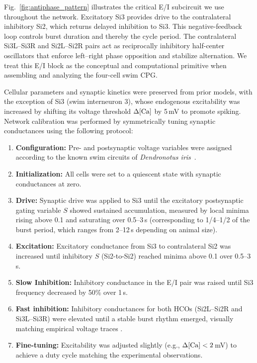\documentclass[nofootinbib,aip,amsmath,amssymb,preprint,twocolumn,floatfix,10pt]{revtex4-2}
\begin{document}
Fig.~\ref{fig:antiphase_pattern} illustrates the critical E/I subcircuit we use throughout the network. Excitatory Si3 provides drive to the contralateral inhibitory Si2, which returns delayed inhibition to Si3. This negative-feedback loop controls burst duration and thereby the cycle period. The contralateral Si3L--Si3R and Si2L--Si2R pairs act as reciprocally inhibitory half-center oscillators that enforce left--right phase opposition and stabilize alternation. We treat this E/I block as the conceptual and computational primitive when assembling and analyzing the four-cell swim CPG.

Cellular parameters and synaptic kinetics were preserved from prior models, with the exception of Si3 (swim interneuron 3), whose endogenous excitability was increased by shifting its voltage threshold $\Delta [\rm Ca]$ by 5\,mV to promote spiking. Network calibration was performed by symmetrically tuning synaptic conductances using the following protocol:

\begin{enumerate}
  \item \textbf{Configuration:} Pre- and postsynaptic voltage variables were assigned according to the known swim circuits of \textit{Dendronotus iris}~\cite{SakuraiKatz2016}.
  \item \textbf{Initialization:} All cells were set to a quiescent state with synaptic conductances at zero.
  \item \textbf{Drive:} Synaptic drive was applied to Si3 until the excitatory postsynaptic gating variable $S$ showed sustained accumulation, measured by local minima rising above 0.1 and saturating over 0.5--3\,s (corresponding to 1/4--1/2 of the burst period, which ranges from 2--12\,s depending on animal size).
  \item \textbf{Excitation:} Excitatory conductance from Si3 to contralateral Si2 was increased until inhibitory $S$ (Si2-to-Si2) reached minima above 0.1 over 0.5--3\,s.
  \item \textbf{Slow Inhibition:} Inhibitory conductance in the E/I pair was raised until Si3 frequency decreased by 50\% over 1\,s.
  \item \textbf{Fast inhibition:} Inhibitory conductances for both HCOs (Si2L--Si2R and Si3L--Si3R) were elevated until a stable burst rhythm emerged, visually matching empirical voltage traces \cite{SakuraiKatz2016}.
  \item \textbf{Fine-tuning:} Excitability was adjusted slightly (e.g., $\Delta [\rm Ca] < 2$\,mV) to achieve a duty cycle matching the experimental observations.
\end{enumerate}
\end{document}
